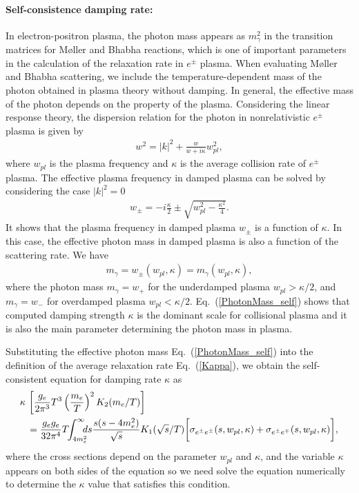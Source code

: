 \paragraph{Self-consistence damping rate:}
In electron-positron plasma, the photon mass appears as $m_\gamma^2$ in the transition matrices for M{\o}ller and Bhabha reactions, which is one of important parameters in the calculation of the relaxation rate in $e^\pm$ plasma. When evaluating M{\o}ller and Bhabha scattering, we include the temperature-dependent mass of the photon obtained in plasma theory without damping. In general, the effective mass of the photon depends on the property of the plasma. Considering the linear response theory, the dispersion relation for the photon in nonrelativistic $e^\pm$ plasma is given by~\cite{Formanek:2021blc}
\begin{align}\label{dispersion_damping}
w^2=|k|^2+\frac{w}{w+i\kappa}w_{pl}^2,
\end{align}
where $w_{pl}$ is the plasma frequency and $\kappa$ is the average collision rate of $e^\pm$ plasma. The effective plasma frequency in damped plasma can be solved by considering the case $|k|^2=0$~\cite{Formanek:2021blc}
\begin{align}\label{plasmafrequency_damped}
w_{\pm}=-i\frac{\kappa}{2}\pm\sqrt{w^2_{pl}-\frac{\kappa^2}{4}}.
\end{align}
It shows that the plasma frequency in damped plasma $w_\pm$ is a function of $\kappa.$  In this case, the effective photon mass in damped plasma is also a function of the scattering rate. We have
\begin{align}\label{PhotonMass_self}
m_\gamma=w_\pm(w_{pl},\kappa)=m_\gamma(w_{pl},\kappa),
\end{align}
where the photon mass $m_\gamma=w_+$ for the underdamped plasma $w_{pl}>\kappa/2$, and $m_\gamma=w_-$ for overdamped plasma $w_{pl}<\kappa/2$. Eq.~(\ref{PhotonMass_self}) shows that computed damping strength $\kappa$ is the dominant scale for collisional plasma and it is also the main parameter determining the photon mass in plasma. 

Substituting the effective photon mass Eq.~(\ref{PhotonMass_self}) into the definition of the average relaxation rate Eq.~(\ref{Kappa}), we obtain the self-consistent equation for damping rate $\kappa$ as 
\begin{align}\label{RealaxtionSelf}
\kappa\,&\left[\frac{g_e}{2\pi^3}T^3\left(\frac{m_e}{T}\right)^2K_2(m_e/T)\right]\notag\\&=\frac{g_eg_e}{32\pi^4}T\!\!\int_{4m_e^2}^\infty\!\!\!\!ds\frac{s(s-4m^2_e)}{\sqrt{s}}K_1(\sqrt{s}/T)
\bigg[\sigma_{e^\pm e^\pm}(s,w_{pl},\kappa)+\sigma_{e^\pm e^\mp}(s,w_{pl},\kappa)\bigg],
\end{align}
where the cross sections depend on the parameter $w_{pl}$ and $\kappa$, and the variable $\kappa$ appears on both sides of the equation so we need solve the equation numerically to determine the $\kappa$ value that satisfies this condition.



